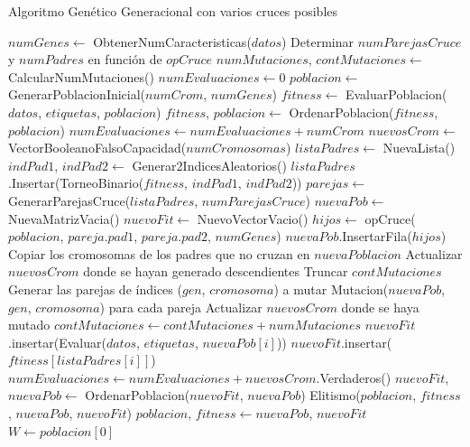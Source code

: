 \documentclass[11pt,a4paper]{article}
\begin{document}
\begin{algorithm}[H]
\caption{Algoritmo Genético Generacional con varios cruces posibles}
\begin{algorithmic}[1]
\State $numGenes \gets$ ObtenerNumCaracteristicas($datos$)
\State Determinar $numParejasCruce$ y $numPadres$ en función de $opCruce$
\State $numMutaciones$, $contMutaciones \gets $ CalcularNumMutaciones()
\State $numEvaluaciones \gets 0$
\State $poblacion \gets$ GenerarPoblacionInicial($numCrom$, $numGenes$)
\State $fitness \gets$ EvaluarPoblacion($datos$, $etiquetas$, $poblacion$)
\State $fitness$, $poblacion \gets$ OrdenarPoblacion($fitness$, $poblacion$)
\State $numEvaluaciones \gets numEvaluaciones + numCrom$
	\State $nuevosCrom \gets$ VectorBooleanoFalsoCapacidad($numCromosomas$)
	\State $listaPadres \gets $ NuevaLista()
		\State $indPad1$, $indPad2 \gets$ Generar2IndicesAleatorios()
		\State $listaPadres$.Insertar(TorneoBinario($fitness$, $indPad1$, $indPad2$))
	\EndFor
	\State $parejas \gets$ GenerarParejasCruce($listaPadres$, $numParejasCruce$)
	\State $nuevaPob \gets$ NuevaMatrizVacia()
	\State $nuevoFit \gets$ NuevoVectorVacio()
		\State $hijos \gets $ opCruce($poblacion$, $pareja.pad1$, $pareja.pad2$, $numGenes$)
		\State $nuevaPob$.InsertarFila($hijos$)
	\EndFor
	\State Copiar los cromosomas de los padres que no cruzan en $nuevaPoblacion$
	\State Actualizar $nuevosCrom$ donde se hayan generado descendientes
		\State Truncar $contMutaciones$
		\State Generar las parejas de índices ($gen$, $cromosoma$) a mutar
		\State Mutacion($nuevaPob$, $gen$, $cromosoma$) para cada pareja
		\State Actualizar $nuevosCrom$ donde se haya mutado
	\Else
		\State $contMutaciones \gets contMutaciones + numMutaciones$
	\EndIf
			\State $nuevoFit$.insertar(Evaluar($datos$, $etiquetas$, $nuevaPob[i]$))
		\Else
			\State $nuevoFit$.insertar($ftiness[listaPadres[i]]$)
		\EndIf
	\EndFor
	\State $numEvaluaciones \gets numEvaluaciones + nuevosCrom$.Verdaderos()
	\State $nuevoFit$, $nuevaPob \gets$ OrdenarPoblacion($nuevoFit$, $nuevaPob$)
	\State Elitismo($poblacion$, $fitness$, $nuevaPob$, $nuevoFit$)
	\State $poblacion$, $fitness \gets nuevaPob$, $nuevoFit$
\EndWhile
\State $W \gets poblacion[0]$
\State {}
\EndFunction
\end{algorithmic}
\end{algorithm}
\end{document}
